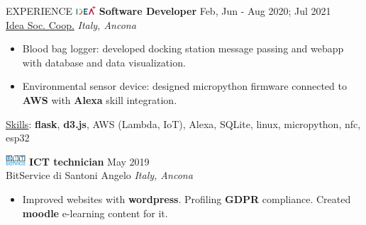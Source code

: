 \documentclass{cv} %
\def\intraexpvspace{0.15cm}
\def\titlelistvspace{-0.15cm}
\begin{document}
\begin{rSection}{EXPERIENCE}
    \includegraphics[width=0.75cm, trim={0cm 1.5cm 0cm 0cm}]{idea-icon.png}
    \textbf{Software Developer} \hfill Feb, Jun - Aug 2020; Jul 2021\\
    \hspace*{0.85cm}\href{https://idea-on-line.it/}{Idea Soc. Coop.} \hfill \textit{Italy, Ancona}
    \vspace{\titlelistvspace}\begin{itemize}
        \itemsep -3pt {}
        \item Blood bag logger: developed docking station message passing and webapp with database and data visualization.
        \item Environmental sensor device: designed micropython firmware
              connected to \textbf{AWS}
              with \textbf{Alexa} skill integration.
    \end{itemize}
    \vspace*{-0.1cm}\hspace*{0.5cm}\underline{Skills}:
    \textbf{flask},
    \textbf{d3.js},
    AWS (Lambda, IoT),
    Alexa,
    SQLite,
    linux,
    micropython,
    nfc,
    esp32
    \vspace{\intraexpvspace}

    \includegraphics[width=0.75cm, trim={0cm 1.5cm 0cm 0cm}]{bitservice-icon.png}
    \textbf{ICT technician} \hfill May 2019 \\
    \hspace*{0.85cm}BitService di Santoni Angelo \hfill \textit{Italy, Ancona}
    \vspace{\titlelistvspace}\begin{itemize}
        \itemsep -3pt {}
        \item Improved websites with \textbf{wordpress}.
              Profiling \textbf{GDPR} compliance.
              Created \textbf{moodle} e-learning content for it. %
    \end{itemize}

\end{rSection}
\end{document}
